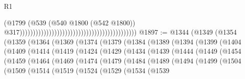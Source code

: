 \begin{lexlean}{R1}
\begin{coremodule}
                                                                                        (@1799
                                                                                          (@539
                                                                                            (@540
                                                                                              @1800
                                                                                              (@542
                                                                                                @1800))
                                                                                            @317))))))))))))))))))))))))))))))))))))))))))))
@1897 := @1344
    (@1349
      (@1354
        (@1359
          (@1364
            (@1369
              (@1374
                (@1379
                  (@1384
                    (@1389
                      (@1394
                        (@1399
                          (@1404
                            (@1409
                              (@1414
                                (@1419
                                  (@1424
                                    (@1429
                                      (@1434
                                        (@1439
                                          (@1444
                                            (@1449
                                              (@1454
                                                (@1459
                                                  (@1464
                                                    (@1469
                                                      (@1474
                                                        (@1479
                                                          (@1484
                                                            (@1489
                                                              (@1494
                                                                (@1499
                                                                  (@1504
                                                                    (@1509
                                                                      (@1514
                                                                        (@1519
                                                                          (@1524
                                                                            (@1529
                                                                              (@1534
                                                                                (@1539

\end{coremodule}
\end{lexlean}
